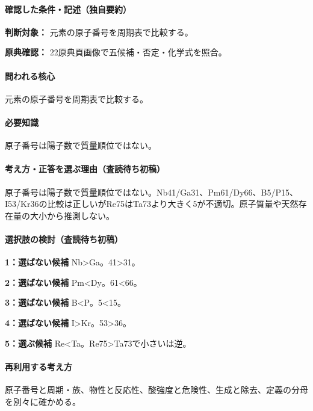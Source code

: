 \paragraph{確認した条件・記述（独自要約）}\mbox{}\par

\noindent\textbf{判断対象：} 元素の原子番号を周期表で比較する。\par

\noindent\textbf{原典確認：} 22原典頁画像で五候補・否定・化学式を照合。\par

\paragraph{問われる核心} 元素の原子番号を周期表で比較する。

\paragraph{必要知識} 原子番号は陽子数で質量順位ではない。

\paragraph{考え方・正答を選ぶ理由（査読待ち初稿）} 原子番号は陽子数で質量順位ではない。Nb41/Ga31、Pm61/Dy66、B5/P15、I53/Kr36の比較は正しいがRe75はTa73より大きく5が不適切。原子質量や天然存在量の大小から推測しない。

\paragraph{選択肢の検討（査読待ち初稿）}\mbox{}\par

\noindent\textbf{1：選ばない候補} Nb>Ga。41>31。\par

\noindent\textbf{2：選ばない候補} Pm<Dy。61<66。\par

\noindent\textbf{3：選ばない候補} B<P。5<15。\par

\noindent\textbf{4：選ばない候補} I>Kr。53>36。\par

\noindent\textbf{5：選ぶ候補} Re<Ta。Re75>Ta73で小さいは逆。\par

\paragraph{再利用する考え方} 原子番号と周期・族、物性と反応性、酸強度と危険性、生成と除去、定義の分母を別々に確かめる。

